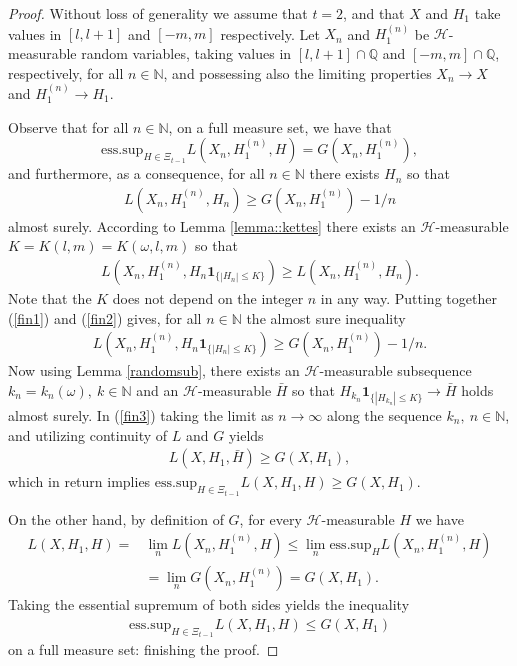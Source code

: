 \documentclass[a4paper]{article}
\newcommand{\indicator}[1]{\mathbf{1}_{\{ #1 \}}}
\begin{document}
\begin{proof}
Without loss of generality we assume that $t = 2$, and that $X$ and $H_1$ take values in $[l,l+1]$ and $[-m,m]$ 
respectively. Let $X_n$ and $H_1^{(n)}$ be $\mathcal{H}$-measurable random variables, taking values in $[l,l+1]\cap\mathbb{Q}$ and 
$[-m,m]\cap\mathbb{Q}$, respectively, for all $n \in \mathbb{N}$, and possessing also 
the limiting properties $X_n \to X$ and $H_1^{(n)} \to H_1$.

Observe that for all $n\in\mathbb{N}$, on a full measure set, we have that $$\mathrm{ess.sup}_{H\in \Xi_{t-1}} L(X_n,H_1^{(n)},H) = G(X_n,H_1^{(n)}),$$ and furthermore, as a consequence, for all $n\in\mathbb{N}$ there exists $H_n$ so that 
\begin{align}\label{fin1}
 L(X_n,H_1^{(n)},H_n) \geq  G(X_n,H_1^{(n)}) - 1/n
\end{align}
almost surely. According to Lemma \ref{lemma::kettes} there exists an $\mathcal{H}$-measurable $K = K(l,m) = K(\omega,l,m)$ so that
\begin{align}\label{fin2}
 L(X_n,H_1^{(n)},H_n \indicator{|H_n|\leq K}) \geq  L(X_n,H_1^{(n)},H_n).
\end{align}
Note that the $K$ does not depend on the integer $n$ in any way. Putting together (\ref{fin1}) and (\ref{fin2}) gives, for all $n \in \mathbb{N}$ the almost sure inequality
\begin{align}\label{fin3}
L(X_n,H_1^{(n)},H_n \indicator{|H_n|\leq K}) \geq  G(X_n,H_1^{(n)}) - 1/n.
\end{align}
Now using Lemma \ref{randomsub}, there exists an $\mathcal{H}$-measurable subsequence $k_n = k_n(\omega), \ k\in\mathbb{N}$ and an $\mathcal{H}$-measurable $\bar H$ so that $H_{k_n} \indicator{|H_{k_n}|\leq K} \to \bar H$ holds almost surely. In (\ref{fin3}) taking the limit as $n \to \infty$ along the sequence $k_n, \ n\in\mathbb{N}$, and utilizing continuity of $L$ and $G$ yields
\begin{align*}
L(X,H_1,\bar H) \geq G(X,H_1),
\end{align*}
which in return implies $\mathrm{ess.sup}_{H\in \Xi_{t-1}}L(X,H_1,H) \geq G(X,H_1)$.

On the other hand, by definition of $G$, for every $\mathcal{H}$-measurable $H$ we have 
\begin{align*}
L(X,H_1,H) =& \lim_{n}L(X_n,H_1^{(n)},H) \leq \lim_{n} \mbox{ess.sup}_{H}L(X_n,H_1^{(n)},H)
\\
&=
 \lim_{n} G(X_n, H_1^{(n)}) = G(X,H_1).
\end{align*}
Taking the essential supremum of both sides yields the inequality
\begin{align*}
\mathrm{ess.sup}_{H\in \Xi_{t-1}}L(X,H_1,H) \leq G(X, H_1)
\end{align*}
on a full measure set: finishing the proof.
\end{proof}
\end{document}
